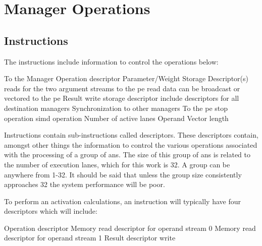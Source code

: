 \section{Manager Operations}
\label{sec:Manager Operations}

\subsection{Instructions}
\label{sec:Instructions}
The instructions include information to control the operations below:

\begin{outline}
        \1 To the Manager
            \2 Operation descriptor
            \2 Parameter/Weight Storage Descriptor(s)
                \3 reads for the two argument streams to the \ac{pe}
                \3 read data can be broadcast or vectored to the \ac{pe}
            \2 Result write storage descriptor
                \3 include descriptors for all destination managers
            \2 Synchronization to other managers
        \1 To the \ac{pe}
            \2 \ac{stop} operation
            \2 \ac{simd} operation
            \2 Number of active lanes
            \2 Operand Vector length
\end{outline}


Instructions contain sub-instructions called descriptors. These descriptors contain, amongst other things the information to control the various operations associated with the processing of a group of \acp{an}.
The size of this group of \acp{an} is related to the number of execution lanes, which for this work is 32. A group can be anywhere from 1-32. It should be said that unless the group size consistently approaches 32 the system performance will be poor.

To perform \ac{an} activation calculations, an instruction will typically have four descriptors which will include:

\begin{outline}
\renewcommand{\outlinei}{enumerate}
    \1 Operation descriptor 
    \1 Memory read descriptor for operand stream 0
    \1 Memory read descriptor for operand stream 1
    \1 Result descriptor write
\end{outline}

